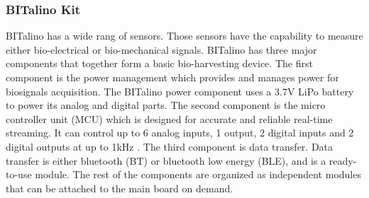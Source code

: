         \subsubsection{BITalino Kit}
            BITalino has a wide rang of sensors. Those sensors have the capability to measure either bio-electrical or bio-mechanical signals. BITalino has three major components that together form a basic bio-harvesting device. The first component is the power management which provides and manages power for biosignals acquisition. The BITalino power component uses a 3.7V LiPo battery to power its analog and digital parts. The second component is the micro controller unit (MCU) which is designed for accurate and reliable real-time streaming. It can control up to 6 analog inputs, 1 output, 2 digital inputs and 2 digital outputs at up to 1kHz \cite{BITalino_MCU}. The third component is data transfer. Data transfer is either bluetooth (BT) or bluetooth low energy (BLE), and is a ready-to-use module. The rest of the components are organized as independent modules that can be attached to the main board on demand.
            
